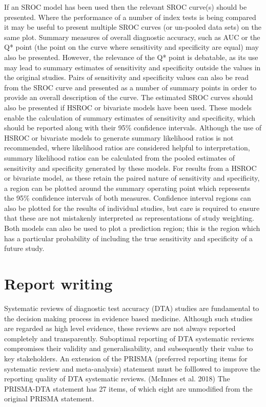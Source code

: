 \documentclass[
  10pt,
  a4paper,
  DIV=11,
  numbers=noendperiod]{scrreprt}
\begin{document}
If an SROC model has been used then the relevant SROC curve(s) should be
presented. Where the performance of a number of index tests is being
compared it may be useful to present multiple SROC curves (or un-pooled
data sets) on the same plot. Summary measures of overall diagnostic
accuracy, such as AUC or the Q* point (the point on the curve where
sensitivity and specificity are equal) may also be presented. However,
the relevance of the Q* point is debatable, as its use may lead to
summary estimates of sensitivity and specificity outside the values in
the original studies. Pairs of sensitivity and specificity values can
also be read from the SROC curve and presented as a number of summary
points in order to provide an overall description of the curve. The
estimated SROC curves should also be presented if HSROC or bivariate
models have been used. These models enable the calculation of summary
estimates of sensitivity and specificity, which should be reported along
with their 95\% confidence intervals. Although the use of HSROC or
bivariate models to generate summary likelihood ratios is not
recommended, where likelihood ratios are considered helpful to
interpretation, summary likelihood ratios can be calculated from the
pooled estimates of sensitivity and specificity generated by these
models. For results from a HSROC or bivariate model, as these retain the
paired nature of sensitivity and specificity, a region can be plotted
around the summary operating point which represents the 95\% confidence
intervals of both measures. Confidence interval regions can also be
plotted for the results of individual studies, but care is required to
ensure that these are not mistakenly interpreted as representations of
study weighting. Both models can also be used to plot a prediction
region; this is the region which has a particular probability of
including the true sensitivity and specificity of a future study.

\section{Report writing}\label{report-writing-1}

Systematic reviews of diagnostic test accuracy (DTA) studies are
fundamental to the decision making process in evidence based medicine.
Although such studies are regarded as high level evidence, these reviews
are not always reported completely and transparently. Suboptimal
reporting of DTA systematic reviews compromises their validity and
generalisability, and subsequently their value to key stakeholders. An
extension of the PRISMA (preferred reporting items for systematic review
and meta-analysis) statement must be folllowed to improve the reporting
quality of DTA systematic reviews. (McInnes et al. 2018) The PRISMA-DTA
statement has 27 items, of which eight are unmodified from the original
PRISMA statement.
\end{document}
